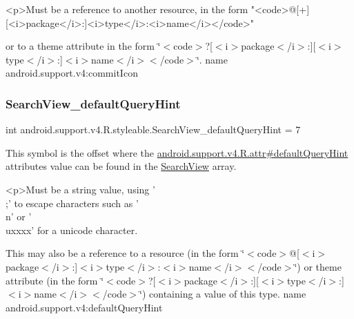 \begin{DoxyVerb}      <p>Must be a reference to another resource, in the form "<code>@[+][<i>package</i>:]<i>type</i>:<i>name</i></code>"
\end{DoxyVerb}
 or to a theme attribute in the form \char`\"{}$<$code$>$?\mbox{[}$<$i$>$package$<$/i$>$\+:\mbox{]}\mbox{[}$<$i$>$type$<$/i$>$\+:\mbox{]}$<$i$>$name$<$/i$>$$<$/code$>$\char`\"{}.  name android.\+support.\+v4\+:commit\+Icon \mbox{\label{classandroid_1_1support_1_1v4_1_1R_1_1styleable_a0dba0574ce30d30bc8ac0941fe674251}} 
\subsubsection{\texorpdfstring{Search\+View\+\_\+default\+Query\+Hint}{SearchView\_defaultQueryHint}}
{\footnotesize\ttfamily int android.\+support.\+v4.\+R.\+styleable.\+Search\+View\+\_\+default\+Query\+Hint = 7\hspace{0.3cm}{\ttfamily [static]}}

This symbol is the offset where the \hyperlink{classandroid_1_1support_1_1v4_1_1R_1_1attr_a825f7cdc9650f92601bc34873e291e96}{android.\+support.\+v4.\+R.\+attr\#default\+Query\+Hint} attribute\textquotesingle{}s value can be found in the \hyperlink{classandroid_1_1support_1_1v4_1_1R_1_1styleable_a7f709410d566e9fd5d4c710e815c300a}{Search\+View} array.

\begin{DoxyVerb}      <p>Must be a string value, using '\\;' to escape characters such as '\\n' or '\\uxxxx' for a unicode character.
\end{DoxyVerb}
 

This may also be a reference to a resource (in the form \char`\"{}$<$code$>$@\mbox{[}$<$i$>$package$<$/i$>$\+:\mbox{]}$<$i$>$type$<$/i$>$\+:$<$i$>$name$<$/i$>$$<$/code$>$\char`\"{}) or theme attribute (in the form \char`\"{}$<$code$>$?\mbox{[}$<$i$>$package$<$/i$>$\+:\mbox{]}\mbox{[}$<$i$>$type$<$/i$>$\+:\mbox{]}$<$i$>$name$<$/i$>$$<$/code$>$\char`\"{}) containing a value of this type.  name android.\+support.\+v4\+:default\+Query\+Hint \mbox{\label{classandroid_1_1support_1_1v4_1_1R_1_1styleable_a4650e52ef5aadf8f43fe5a614b055cc4}} 
